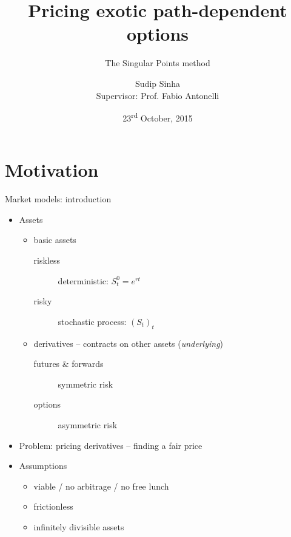 \documentclass[utf8,t,xcolor=svgnames]{beamer}
\title{Pricing exotic path-dependent options}
\subtitle{The Singular Points method \cite{Gaudenzi2010,Gaudenzi2011}}
\date[2015-10-23]{23\textsuperscript{rd} October, 2015}
\institute[MathMods]{MathMods\\{Università degli Studi dell'Aquila}}
\author[Sudip Sinha]{Sudip Sinha\\{Supervisor: Prof. Fabio Antonelli}}
\begin{document}
\begin{frame}[plain]
    \maketitle
\end{frame}


\section{Motivation}

\begin{frame}{Market models: introduction}
	\begin{itemize}
		
		\item Assets
		\begin{itemize}
			\item basic assets
			\begin{description}
				\item[riskless] deterministic: $ S_t^0 = e^{rt} $
				\item[risky] stochastic process: $ (S_t)_t $
			\end{description}
			\item derivatives -- contracts on other assets (\emph{underlying})
			\begin{description}
				\item[futures \& forwards] symmetric risk
				\item[options] asymmetric risk
			\end{description}			
		\end{itemize}
		
		\item Problem: pricing derivatives -- finding a fair price
		
		\item Assumptions
		\begin{itemize}
			\item viable / no arbitrage / no free lunch
			\item frictionless
			\item infinitely divisible assets
		\end{itemize}
	\end{itemize}
	
\end{frame}
\end{document}
